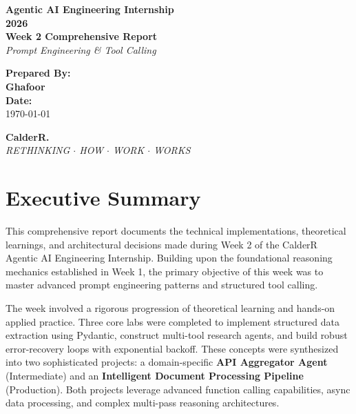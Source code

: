 \documentclass[12pt, a4paper]{article}
\begin{document}
\begin{titlepage}
    \centering
    \vspace*{2cm}
    
    {\Huge \textbf{\textcolor{primary}{Agentic AI Engineering Internship}}} \\[0.5cm]
    {\Huge \textbf{\textcolor{primary}{2026}}} \\[1.5cm]
    
    {\LARGE \textbf{Week 2 Comprehensive Report}} \\[0.5cm]
    {\Large \textit{Prompt Engineering \& Tool Calling}} \\[2cm]
    
    \begin{tcolorbox}[colback=accent, colframe=primary, rounded corners, boxrule=1.5pt, width=0.75\textwidth, arc=4mm]
        \centering
        \vspace{0.4cm}
        {\Large \textbf{Prepared By:}} \\[0.2cm]
        {\Large \textbf{Ghafoor}} \\[0.4cm]
        {\large \textbf{Date:}} \\
        {\large \today}
        \vspace{0.4cm}
    \end{tcolorbox}
    
    \vfill
    
    {\huge \textbf{\textcolor{secondary}{CalderR.}}} \\[0.2cm]
    {\large \textit{RETHINKING $\cdot$ HOW $\cdot$ WORK $\cdot$ WORKS}}
    \vspace*{1cm}
\end{titlepage}

\tableofcontents
\newpage

\section{Executive Summary}
This comprehensive report documents the technical implementations, theoretical learnings, and architectural decisions made during Week 2 of the CalderR Agentic AI Engineering Internship. Building upon the foundational reasoning mechanics established in Week 1, the primary objective of this week was to master advanced prompt engineering patterns and structured tool calling. 

The week involved a rigorous progression of theoretical learning and hands-on applied practice. Three core labs were completed to implement structured data extraction using Pydantic, construct multi-tool research agents, and build robust error-recovery loops with exponential backoff. These concepts were synthesized into two sophisticated projects: a domain-specific \textbf{API Aggregator Agent} (Intermediate) and an \textbf{Intelligent Document Processing Pipeline} (Production). Both projects leverage advanced function calling capabilities, async data processing, and complex multi-pass reasoning architectures.
\end{document}
